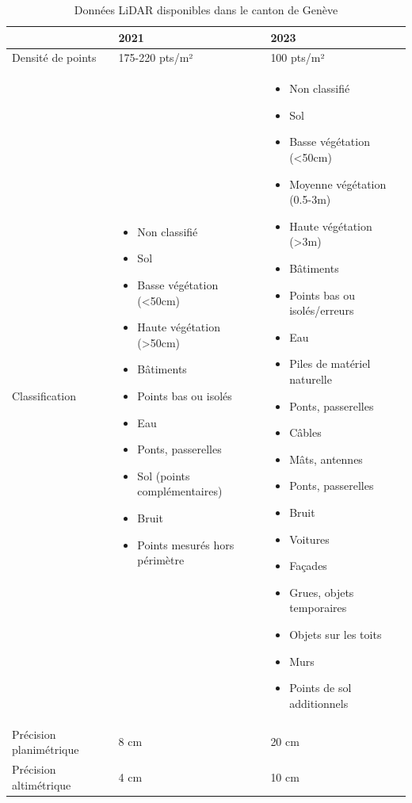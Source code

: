 \begin{table}[htbp]
    \centering
    \caption{Données LiDAR disponibles dans le canton de Genève}
    \label{tab:lidar_geneve}
    \begin{tabular}{|p{3cm}|p{5cm}|p{5cm}|}
    \hline
    & \textbf{2021} & \textbf{2023} \\
    \hline
    Densité de points & 175-220 pts/m² & 100 pts/m² \\
    \hline
    Classification & \begin{itemize}
        \item Non classifié
        \item Sol
        \item Basse végétation (<50cm)
        \item Haute végétation (>50cm)
        \item Bâtiments
        \item Points bas ou isolés
        \item Eau
        \item Ponts, passerelles
        \item Sol (points complémentaires)
        \item Bruit
        \item Points mesurés hors périmètre
    \end{itemize} & \begin{itemize}
        \item Non classifié
        \item Sol
        \item Basse végétation (<50cm)
        \item Moyenne végétation (0.5-3m)
        \item Haute végétation (>3m)
        \item Bâtiments
        \item Points bas ou isolés/erreurs
        \item Eau
        \item Piles de matériel naturelle
        \item Ponts, passerelles
        \item Câbles
        \item Mâts, antennes
        \item Ponts, passerelles
        \item Bruit
        \item Voitures
        \item Façades
        \item Grues, objets temporaires
        \item Objets sur les toits
        \item Murs
        \item Points de sol additionnels
    \end{itemize} \\
    \hline
    Précision planimétrique & 8 cm & 20 cm \\
    \hline
    Précision altimétrique & 4 cm & 10 cm \\
    \hline
    \end{tabular}
\end{table}

